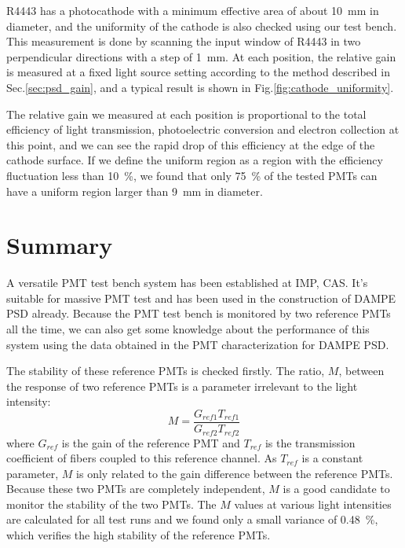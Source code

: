 \documentclass[review, times]{elsarticle}
\begin{document}
R4443 has a photocathode with a minimum effective area of about \SI{10}{\milli\meter} in diameter, and the uniformity of the cathode is also checked using our test bench.
This measurement is done by scanning the input window of R4443 in two perpendicular directions with a step of \SI{1}{\milli\meter}.
At each position, the relative gain is measured at a fixed light source setting according to the method described in Sec.\ref{sec:psd_gain}, and a typical result is shown in Fig.\ref{fig:cathode_uniformity}.

The relative gain we measured at each position is proportional to the total efficiency of light transmission, photoelectric conversion and electron collection at this point, and we can see the rapid drop of this efficiency at the edge of the cathode surface. 
If we define the uniform region as a region with the efficiency fluctuation less than \SI{10}{\percent}, we found that only \SI{75}{\percent} of the tested PMTs can have a uniform region larger than \SI{9}{\milli\meter} in diameter. 

\section{Summary}
\label{sec:summary}

A versatile PMT test bench system has been established at IMP, CAS. It's suitable for massive PMT test and has been used in the construction of DAMPE PSD already. Because the PMT test bench is monitored by two reference PMTs all the time, we can also get some knowledge about the performance of this system using the data obtained in the PMT characterization for DAMPE PSD.

The stability of these reference PMTs is checked firstly. The ratio, $M$, between the response of two reference PMTs is a parameter irrelevant to the light intensity:
\begin{equation}
 M = \frac{G_{ref1} T_{ref1}}{G_{ref2} T_{ref2}}
\end{equation}
where $G_{ref}$ is the gain of the reference PMT and $T_{ref}$ is the transmission coefficient of fibers coupled to this reference channel.
As $T_{ref}$ is a constant parameter, $M$ is only related to the gain difference between the reference PMTs.
Because these two PMTs are completely independent, $M$ is a good candidate to monitor the stability of the two PMTs. 
The $M$ values at various light intensities are calculated for all test runs and we found only a small variance of \SI{0.48}{\percent}, which verifies the high stability of the reference PMTs.
\end{document}
